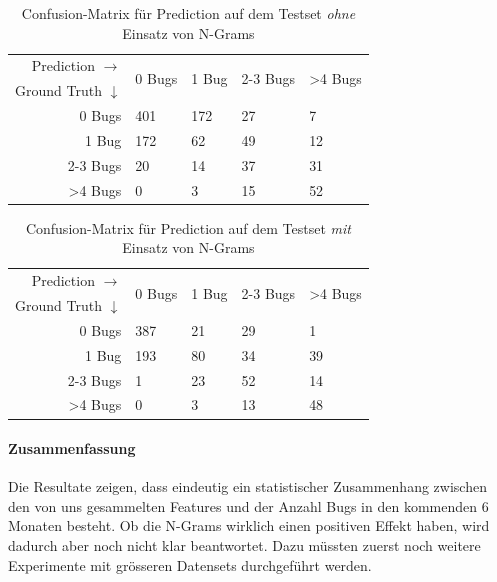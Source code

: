\documentclass[10pt, a4paper]{article}
\begin{document}
\begin{table}[ht]
	\begin{tabular}[c]{|r|l|l|l|l|}
		\hline
		Prediction $\rightarrow$ 
			& \multirow{2}{*}{0 Bugs}
			& \multirow{2}{*}{1 Bug}
			& \multirow{2}{*}{2-3 Bugs}
			& \multirow{2}{*}{\textgreater4 Bugs} \\
		Ground Truth $\downarrow$	&	&	&	&		\\ \hline
		0 Bugs					& 401	& 172	& 27	& 7		\\ \hline
		1 Bug					& 172	& 62	& 49	& 12	\\ \hline
		2-3 Bugs				& 20	& 14	& 37	& 31	\\ \hline
		\textgreater4 Bugs		& 0		& 3		& 15	& 52	\\ \hline
	\end{tabular}
	\centering
	\caption{Confusion-Matrix für Prediction auf dem Testset \emph{ohne} Einsatz von N-Grams}
	\label{tab:confusion_matrix_without_ngrams}
\end{table}

\begin{table}[ht]
	\begin{tabular}[c]{|r|l|l|l|l|}
		\hline
		Prediction $\rightarrow$ 
			& \multirow{2}{*}{0 Bugs}
			& \multirow{2}{*}{1 Bug}
			& \multirow{2}{*}{2-3 Bugs}
			& \multirow{2}{*}{\textgreater4 Bugs} \\
		Ground Truth $\downarrow$	&	&	&	&		\\ \hline
		0 Bugs					& 387	& 21	& 29	& 1		\\ \hline
		1 Bug					& 193	& 80	& 34	& 39	\\ \hline
		2-3 Bugs				& 1		& 23	& 52	& 14	\\ \hline
		\textgreater4 Bugs		& 0		& 3		& 13	& 48	\\ \hline
	\end{tabular}
	\centering
	\caption{Confusion-Matrix für Prediction auf dem Testset \emph{mit} Einsatz von N-Grams}
	\label{tab:confusion_matrix_with_ngrams}
\end{table}

\paragraph{Zusammenfassung}
Die Resultate zeigen, dass eindeutig ein statistischer Zusammenhang zwischen den von uns gesammelten Features und der Anzahl Bugs in den kommenden 6 Monaten besteht. Ob die N-Grams wirklich einen positiven Effekt haben, wird dadurch aber noch nicht klar beantwortet. Dazu müssten zuerst noch weitere Experimente mit grösseren Datensets durchgeführt werden.
\end{document}
